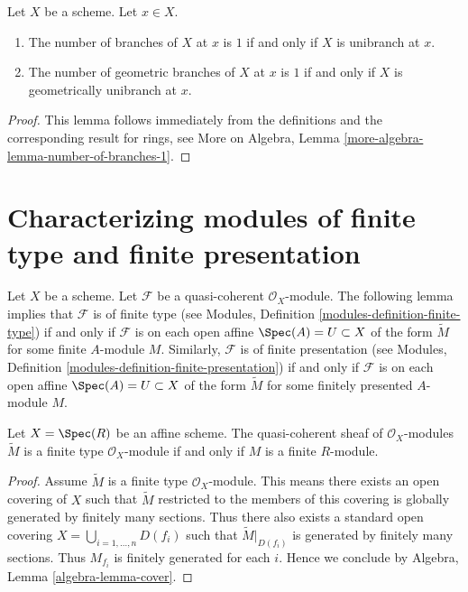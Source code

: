 \begin{lemma}
\label{lemma-number-of-branches-1}
Let $X$ be a scheme. Let $x \in X$.
\begin{enumerate}
\item The number of branches of $X$ at $x$ is $1$ if and only if
$X$ is unibranch at $x$.
\item The number of geometric branches of $X$ at $x$ is $1$ if and only if
$X$ is geometrically unibranch at $x$.
\end{enumerate}
\end{lemma}

\begin{proof}
This lemma follows immediately from the definitions and the corresponding
result for rings, see More on Algebra, Lemma
\ref{more-algebra-lemma-number-of-branches-1}.
\end{proof}






\section{Characterizing modules of finite type and finite presentation}
\label{section-characterizing-finite-type-presentation}

\noindent
Let $X$ be a scheme.
Let $\mathcal{F}$ be a quasi-coherent $\mathcal{O}_X$-module.
The following lemma implies that $\mathcal{F}$ is of finite type
(see Modules, Definition \ref{modules-definition-finite-type})
if and only if $\mathcal{F}$ is
on each open affine $\Spec(A) = U \subset X$
of the form $\widetilde M$ for some finite $A$-module $M$.
Similarly, $\mathcal{F}$ is of finite presentation
(see Modules, Definition \ref{modules-definition-finite-presentation})
if and only if $\mathcal{F}$ is
on each open affine $\Spec(A) = U \subset X$
of the form $\widetilde M$ for some finitely presented $A$-module $M$.

\begin{lemma}
\label{lemma-finite-type-module}
Let $X = \Spec(R)$ be an affine scheme.
The quasi-coherent sheaf of $\mathcal{O}_X$-modules
$\widetilde M$ is a finite type $\mathcal{O}_X$-module
if and only if $M$ is a finite $R$-module.
\end{lemma}

\begin{proof}
Assume $\widetilde M$ is a finite type $\mathcal{O}_X$-module.
This means there exists an open covering of $X$ such that
$\widetilde M$ restricted to the members of this covering is
globally generated by finitely many sections.
Thus there also exists a standard open covering
$X = \bigcup_{i = 1, \ldots, n} D(f_i)$ such that $\widetilde M|_{D(f_i)}$
is generated by finitely many sections. Thus $M_{f_i}$ is finitely
generated for each $i$. Hence we conclude by
Algebra, Lemma \ref{algebra-lemma-cover}.
\end{proof}

